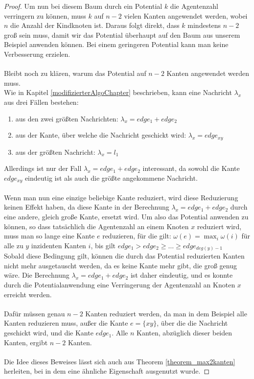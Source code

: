 \begin{proof}
	Um nun bei diesem Baum durch ein Potential $k$ die Agentenzahl verringern zu können, muss $k$ auf $n-2$ vielen Kanten angewendet werden, wobei $n$ die Anzahl der Kindknoten ist. Daraus folgt direkt, dass $k$ mindestens $n-2$ groß sein muss, damit wir das Potential überhaupt auf den Baum aus unserem Beispiel anwenden können. Bei einem geringeren Potential kann man keine Verbesserung erzielen.
	\\
	\\
	Bleibt noch zu klären, warum das Potential auf $n-2$ Kanten angewendet werden muss.
	\\
	Wie in Kapitel \ref{modifizierterAlgoChapter} beschrieben, kann eine Nachricht $\lambda_{x}$ aus drei Fällen bestehen:
	\begin{enumerate}[label=\alph*)]
		\item aus den zwei größten Nachrichten: $\lambda_{x} = edge_{1} + edge_{2}$
		\item aus der Kante, über welche die Nachricht geschickt wird: $\lambda_{x} = edge_{xy}$
		\item aus der größten Nachricht: $\lambda_{x} = l_{1}$
	\end{enumerate}	
	Allerdings ist nur der Fall $\lambda_{x} = edge_{1} + edge_{2}$ interessant, da sowohl die Kante $edge_{xy}$ eindeutig ist als auch die größte angekommene Nachricht.
	\\
	\\
	Wenn man nun eine einzige beliebige Kante reduziert, wird diese Reduzierung keinen Effekt haben, da diese Kante in der Berechnung $\lambda_{x} = edge_{1} + edge_{2}$ durch eine andere, gleich große Kante, ersetzt wird. Um also das Potential anwenden zu können, so dass tatsächlich die Agentenzahl an einem Knoten $x$ reduziert wird, muss man so lange eine Kante $e$ reduzieren, für die gilt: $\omega(e) = \max_{i} \omega(i)$ für alle zu $y$ inzidenten Kanten $i$, bis gilt $edge_{1} > edge_{2} \geq \dots \geq edge_{deg(y)-1}$
	\\
	Sobald diese Bedingung gilt, können die durch das Potential reduzierten Kanten nicht mehr ausgetauscht werden, da es keine Kante mehr gibt, die groß genug wäre. Die Berechnung $\lambda_{x} = edge_{1} + edge_{2}$ ist daher eindeutig, und es konnte durch die Potentialanwendung eine Verringerung der Agentenzahl an Knoten $x$ erreicht werden. 
	\\
	\\
	Dafür müssen genau $n-2$ Kanten reduziert werden, da man in dem Beispiel alle Kanten reduzieren muss, außer die Kante $e = \{xy\}$, über die die Nachricht geschickt wird, und die Kante $edge_{1}$. Alle $n$ Kanten, abzüglich dieser beiden Kanten, ergibt $n-2$ Kanten.
	\\
	\\
	Die Idee dieses Beweises lässt sich auch aus Theorem \ref{theorem_max2kanten} herleiten, bei in dem eine ähnliche Eigenschaft ausgenutzt wurde.
	
\end{proof}



